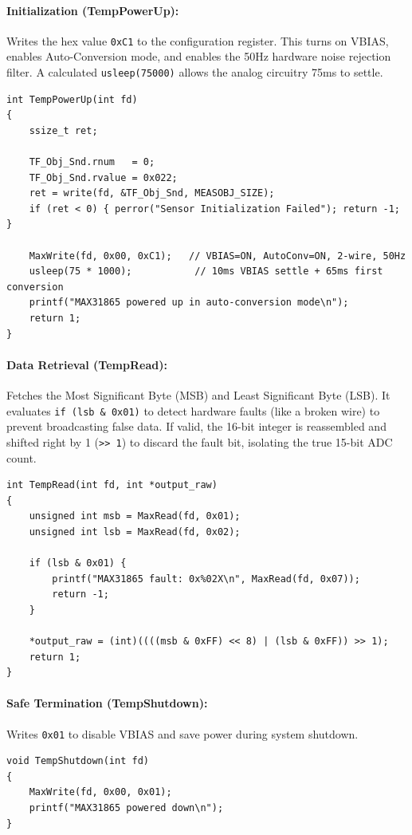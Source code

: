 \paragraph{Initialization (TempPowerUp): }
Writes the hex value \texttt{0xC1} to the configuration register. This turns on VBIAS, enables Auto-Conversion mode, and enables the 50Hz hardware noise rejection filter. A calculated \texttt{usleep(75000)} allows the analog circuitry 75ms to settle.
\begin{verbatim}
int TempPowerUp(int fd)
{
    ssize_t ret;

    TF_Obj_Snd.rnum   = 0;
    TF_Obj_Snd.rvalue = 0x022;
    ret = write(fd, &TF_Obj_Snd, MEASOBJ_SIZE);
    if (ret < 0) { perror("Sensor Initialization Failed"); return -1; }

    MaxWrite(fd, 0x00, 0xC1);   // VBIAS=ON, AutoConv=ON, 2-wire, 50Hz
    usleep(75 * 1000);           // 10ms VBIAS settle + 65ms first conversion
    printf("MAX31865 powered up in auto-conversion mode\n");
    return 1;
}
\end{verbatim}



\paragraph{Data Retrieval (TempRead): }
Fetches the Most Significant Byte (MSB) and Least Significant Byte (LSB). It evaluates \texttt{if (lsb \& 0x01)} to detect hardware faults (like a broken wire) to prevent broadcasting false data. If valid, the 16-bit integer is reassembled and shifted right by 1 (\texttt{>> 1}) to discard the fault bit, isolating the true 15-bit ADC count.
\begin{verbatim}
int TempRead(int fd, int *output_raw)
{
    unsigned int msb = MaxRead(fd, 0x01);
    unsigned int lsb = MaxRead(fd, 0x02);

    if (lsb & 0x01) {
        printf("MAX31865 fault: 0x%02X\n", MaxRead(fd, 0x07));
        return -1;
    }

    *output_raw = (int)((((msb & 0xFF) << 8) | (lsb & 0xFF)) >> 1);
    return 1;
}
\end{verbatim}


\paragraph{Safe Termination (TempShutdown): }
Writes \texttt{0x01} to disable VBIAS and save power during system shutdown.
\begin{verbatim}
void TempShutdown(int fd)
{
    MaxWrite(fd, 0x00, 0x01);
    printf("MAX31865 powered down\n");
}
\end{verbatim}

